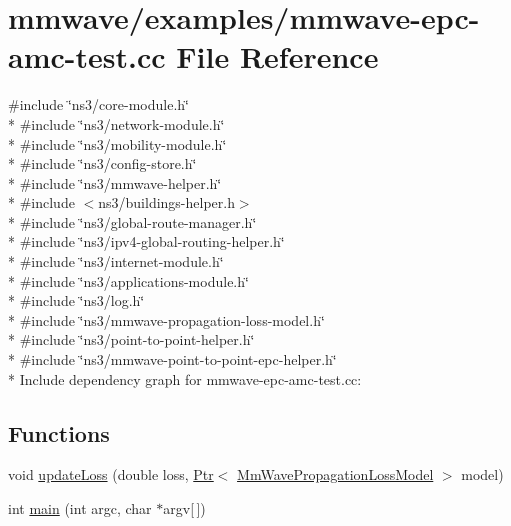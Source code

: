\hypertarget{mmwave-epc-amc-test_8cc}{}\section{mmwave/examples/mmwave-\/epc-\/amc-\/test.cc File Reference}
\label{mmwave-epc-amc-test_8cc}
{\ttfamily \#include \char`\"{}ns3/core-\/module.\+h\char`\"{}}\\*
{\ttfamily \#include \char`\"{}ns3/network-\/module.\+h\char`\"{}}\\*
{\ttfamily \#include \char`\"{}ns3/mobility-\/module.\+h\char`\"{}}\\*
{\ttfamily \#include \char`\"{}ns3/config-\/store.\+h\char`\"{}}\\*
{\ttfamily \#include \char`\"{}ns3/mmwave-\/helper.\+h\char`\"{}}\\*
{\ttfamily \#include $<$ns3/buildings-\/helper.\+h$>$}\\*
{\ttfamily \#include \char`\"{}ns3/global-\/route-\/manager.\+h\char`\"{}}\\*
{\ttfamily \#include \char`\"{}ns3/ipv4-\/global-\/routing-\/helper.\+h\char`\"{}}\\*
{\ttfamily \#include \char`\"{}ns3/internet-\/module.\+h\char`\"{}}\\*
{\ttfamily \#include \char`\"{}ns3/applications-\/module.\+h\char`\"{}}\\*
{\ttfamily \#include \char`\"{}ns3/log.\+h\char`\"{}}\\*
{\ttfamily \#include \char`\"{}ns3/mmwave-\/propagation-\/loss-\/model.\+h\char`\"{}}\\*
{\ttfamily \#include \char`\"{}ns3/point-\/to-\/point-\/helper.\+h\char`\"{}}\\*
{\ttfamily \#include \char`\"{}ns3/mmwave-\/point-\/to-\/point-\/epc-\/helper.\+h\char`\"{}}\\*
Include dependency graph for mmwave-\/epc-\/amc-\/test.cc\+:
\subsection*{Functions}
\begin{DoxyCompactItemize}
\item 
void \hyperlink{mmwave-epc-amc-test_8cc_adfea4867a62217f5e5e9a8ff5e69a5ad}{update\+Loss} (double loss, \hyperlink{classns3_1_1Ptr}{Ptr}$<$ \hyperlink{classMmWavePropagationLossModel}{Mm\+Wave\+Propagation\+Loss\+Model} $>$ model)
\item 
int \hyperlink{mmwave-epc-amc-test_8cc_a0ddf1224851353fc92bfbff6f499fa97}{main} (int argc, char $\ast$argv\mbox{[}$\,$\mbox{]})
\end{DoxyCompactItemize}
